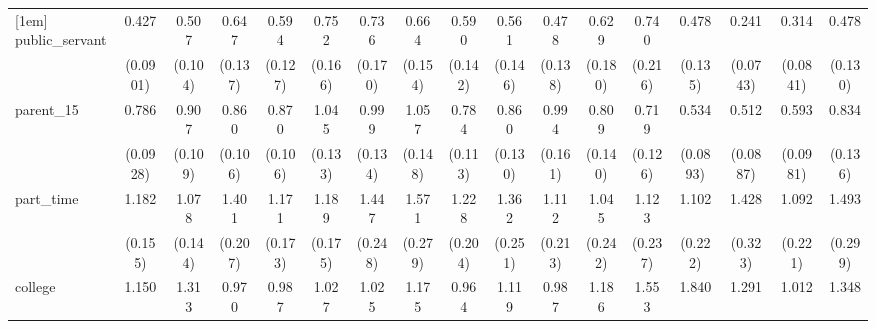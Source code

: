 {\begin{tabular}{l*{16}{c}}
[1em]
public\_servant      &       0.427\sym{***}&       0.507\sym{***}&       0.647\sym{*}  &       0.594\sym{*}  &       0.752         &       0.736         &       0.664         &       0.590\sym{*}  &       0.561\sym{*}  &       0.478\sym{*}  &       0.629         &       0.740         &       0.478\sym{**} &       0.241\sym{***}&       0.314\sym{***}&       0.478\sym{**} \\
                    &    (0.0901)         &     (0.104)         &     (0.137)         &     (0.127)         &     (0.166)         &     (0.170)         &     (0.154)         &     (0.142)         &     (0.146)         &     (0.138)         &     (0.180)         &     (0.216)         &     (0.135)         &    (0.0743)         &    (0.0841)         &     (0.130)         \\
[1em]
parent\_15           &       0.786\sym{*}  &       0.907         &       0.860         &       0.870         &       1.045         &       0.999         &       1.057         &       0.784         &       0.860         &       0.994         &       0.809         &       0.719         &       0.534\sym{***}&       0.512\sym{***}&       0.593\sym{**} &       0.834         \\
                    &    (0.0928)         &     (0.109)         &     (0.106)         &     (0.106)         &     (0.133)         &     (0.134)         &     (0.148)         &     (0.113)         &     (0.130)         &     (0.161)         &     (0.140)         &     (0.126)         &    (0.0893)         &    (0.0887)         &    (0.0981)         &     (0.136)         \\
[1em]
part\_time           &       1.182         &       1.078         &       1.401\sym{*}  &       1.171         &       1.189         &       1.447\sym{*}  &       1.571\sym{*}  &       1.228         &       1.362         &       1.112         &       1.045         &       1.123         &       1.102         &       1.428         &       1.092         &       1.493\sym{*}  \\
                    &     (0.155)         &     (0.144)         &     (0.207)         &     (0.173)         &     (0.175)         &     (0.248)         &     (0.279)         &     (0.204)         &     (0.251)         &     (0.213)         &     (0.242)         &     (0.237)         &     (0.222)         &     (0.323)         &     (0.221)         &     (0.299)         \\
[1em]
college             &       1.150         &       1.313         &       0.970         &       0.987         &       1.027         &       1.025         &       1.175         &       0.964         &       1.119         &       0.987         &       1.186         &       1.553\sym{*}  &       1.840\sym{**} &       1.291         &       1.012         &       1.348         \\

\end{tabular}}
